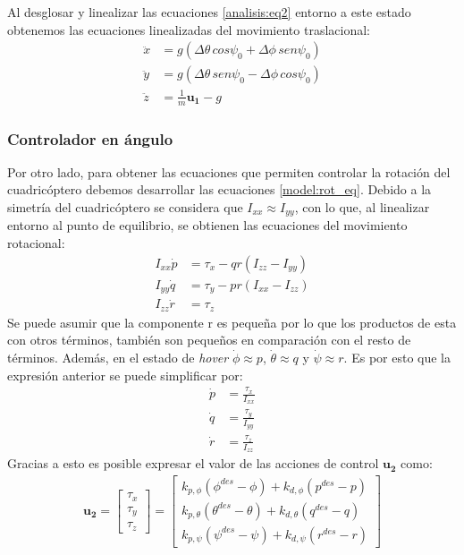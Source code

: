 Al desglosar y linealizar las ecuaciones \ref{analisis:eq2} entorno a este estado obtenemos las ecuaciones linealizadas del movimiento traslacional:
\begin{align}
	\ddot{x} &= g (\Delta\theta\, cos \psi_0 + \Delta\phi\,sen\psi_0)\nonumber \\
	\ddot{y} &= g(\Delta\theta\, sen \psi_0  - \Delta\phi\,cos\psi_0) \label{eq:control1}\\
	\ddot{z} &= \frac{1}{m}\mathbf{u_1}-g\nonumber
\end{align}

\subsubsection{Controlador en ángulo}
Por otro lado, para obtener las ecuaciones que permiten controlar la rotación del cuadricóptero debemos desarrollar las ecuaciones \ref{model:rot_eq}. Debido a la simetría del cuadricóptero se considera que $I_{xx} \approx I_{yy}$, con lo que, al linealizar entorno al punto de equilibrio, se obtienen las ecuaciones del movimiento rotacional:
\begin{align}
	I_ {xx} \dot p &= 	\tau_x - qr(I_{zz}-I_{yy})\nonumber\\
	I_ {yy} \dot q &= 	\tau_y - pr(I_{xx}-I_{zz})\label{eq:control2}\\
	I_ {zz} \dot r &= 	\tau_z \nonumber
\end{align}
Se puede asumir que la componente r es pequeña por lo que los productos de esta con otros términos, también son pequeños en comparación con el resto de términos. Además, en el estado de \textit{hover} $\dot{\phi}\approx p$, $\dot{\theta}\approx q$ y $\dot{\psi}\approx r$. Es por esto que la expresión anterior se puede simplificar por:
\begin{align}
	\dot p &= \frac{\tau_x}{I_ {xx}} \nonumber\\
	\dot q &= \frac{\tau_y}{I_ {yy}}\label{eq:control3}\\
	\dot r &= \frac{\tau_z}{I_ {zz}}\nonumber
\end{align}
Gracias a esto es posible expresar el valor de las acciones de control $\mathbf{u_2}$ como:
\begin{align}
	\label{eq:u2_linearized}
	\mathbf{u_2} =
	\begin{bmatrix}
\tau_x \\
\tau_y \\
\tau_z 
	\end{bmatrix}=
	\begin{bmatrix}
	k_{p,\phi}(\phi^{des}-\phi) + k_{d,\phi}(p^{des}-p)\\
	k_{p,\theta}(\theta^{des}-\theta) + k_{d,\theta}(q^{des}-q)\\
	k_{p,\psi}(\psi^{des}-\psi) + k_{d,\psi}(r^{des}-r)		
\end{bmatrix}
\end{align}

